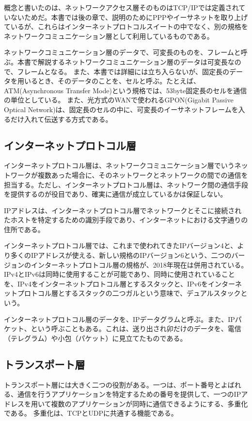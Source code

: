 概念と書いたのは、ネットワークアクセス層そのものはTCP/IPでは定義されていないためだ。本書では後の章で、説明のためにPPPやイーサネットを取り上げているが、これらはインターネットプロトコルスイートの中でなく、別の規格をネットワークコミュニケーション層として利用しているものである。

ネットワークコミュニケーション層のデータで、可変長のものを、フレームと呼ぶ。本書で解説するネットワークコミュニケーション層のデータは可変長なので、フレームとなる。
また、本書では詳細には立ち入らないが、固定長のデータを用いるとき、そのデータのことを、セルと呼ぶ。たとえば、ATM(Asynchronous Transfer Mode)という規格では、53byte固定長のセルを通信の単位としている。
また、光方式のWANで使われるGPON(Gigabit Passive Optical Network)は、固定長のセルの中に、可変長のイーサネットフレームを入るだけ入れて伝送する方式である。

\subsection{インターネットプロトコル層}
インターネットプロトコル層は、ネットワークコミュニケーション層でいうネットワークが複数あった場合に、そのネットワークとネットワークの間での通信を担当する。ただし、インターネットプロトコル層は、ネットワーク間の通信手段を提供するのが役目であり、確実に通信が成立しているかは保証しない。

IPアドレスは、インターネットプロトコル層でネットワークとそこに接続されたホストを特定するための識別手段であり、インターネットにおける文字通りの住所である。

インターネットプロトコル層では、これまで使われてきたIPバージョン4と、より多くのIPアドレスが使える、新しい規格のIPバージョン6という、二つのバージョンのインターネットプロトコル層の規格が、2018年現在は併用されている。IPv4とIPv6は同時に使用することが可能であり、同時に使用されていることを、IPv4をインターネットプロトコル層とするスタックと、IPv6をインターネットプロトコル層とするスタックの二つガルという意味で、デュアルスタックという。

インターネットプロトコル層のデータを、IPデータグラムと呼ぶ。また、IPパケット、という呼ぶこともある。これは、送り出され卯だけのデータを、電信（テレグラム）や小包（パケット）に見立てたものである。

\subsection{トランスポート層}
トランスポート層には大きく二つの役割がある。一つは、ポート番号とよばれる、通信を行うアプリケーションを特定するための番号を提供して、一つのIPアドレスを用いて複数のアプリケーションが同時に通信できるようにする、多重化である。
多重化は、TCPとUDPに共通する機能である。

